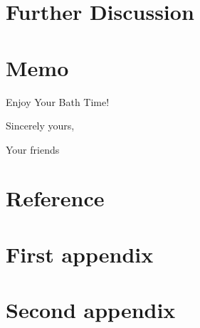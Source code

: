 \documentclass{mcmthesis}
\begin{document}
\section{Further Discussion}



\newpage
\section*{Memo} %

\begin{letter}{Enjoy Your Bath Time!}


\vspace{\parskip}

Sincerely yours,

Your friends

\end{letter}










\newpage
\section*{Reference} %
\printbibliography




\begin{appendices}
\section{First appendix}
\section{Second appendix}
\end{appendices}




\newpage
{}
\setcounter{lastpage}{\value{page}}
\thispagestyle{empty} 
\end{document}
